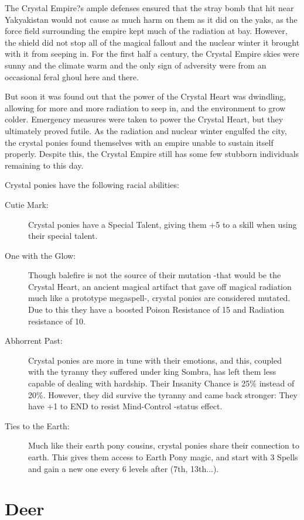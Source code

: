 \documentclass[11pt,a4paper,twocolumn]{book}
\begin{document}
	The Crystal Empire?s ample defenses ensured that the stray bomb that hit near Yakyakistan would not cause as much harm on them as it did on the yaks, as the force field surrounding the empire kept much of the radiation at bay. However, the shield did not stop all of the magical fallout and the nuclear winter it brought with it from seeping in. For the first half a century, the Crystal Empire skies were sunny and the climate warm and the only sign of adversity were from an occasional feral ghoul here and there. 
	
	But soon it was found out that the power of the Crystal Heart was dwindling, allowing for more and more radiation to seep in, and the environment to grow colder. Emergency measures were taken to power the Crystal Heart, but they ultimately proved futile. As the radiation and nuclear winter engulfed the city, the crystal ponies found themselves with an empire unable to sustain itself properly. Despite this, the Crystal Empire still has some few stubborn individuals remaining to this day.
	
	Crystal ponies have the following racial abilities:
	\begin{description}
		\item[Cutie Mark:] Crystal ponies have a Special Talent, giving them +5 to a skill when using their special talent.
		\item[One with the Glow:] Though balefire is not the source of their mutation -that would be the Crystal Heart, an ancient magical artifact that gave off magical radiation much like a prototype megaspell-, crystal ponies are considered mutated. Due to this they have a boosted Poison Resistance of 15 and Radiation resistance of 10.
		\item[Abhorrent Past:] Crystal ponies are more in tune with their emotions, and this, coupled with the tyranny they suffered under king Sombra, has left them less capable of dealing with hardship. Their Insanity Chance is 25\% instead of 20\%. However, they did survive the tyranny and came back stronger: They have +1 to END to resist Mind-Control -status effect.
		\item[Ties to the Earth:] Much like their earth pony cousins, crystal ponies share their connection to earth. This gives them access to Earth Pony magic, and start with 3 Spells and gain a new one every 6 levels after (7th, 13th...).
	\end{description}

	\clearpage
	
	\section*{Deer}
	
\end{document}
